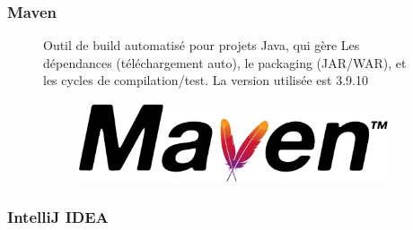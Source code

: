 \documentclass[12pt,a4paper]{report}
\begin{document}
	\subsubsection{Maven}
	
	\begin{figure}[H]
		\begin{minipage}{0.8\textwidth}
			Outil de build automatisé pour projets Java, qui gère Les dépendances (téléchargement auto), le packaging (JAR/WAR), et les cycles de compilation/test. La version utilisée est 3.9.10
		\end{minipage}
		\hfill
		\begin{minipage}{0.15\textwidth} 
			\begin{figure}[H]
				\centering
				\includegraphics[width=\linewidth]{maven-logo.png}
				\label{fig:maven-logo}
			\end{figure}
		\end{minipage}
	\end{figure}
	
	\subsubsection{IntelliJ IDEA}
	
\end{document}
